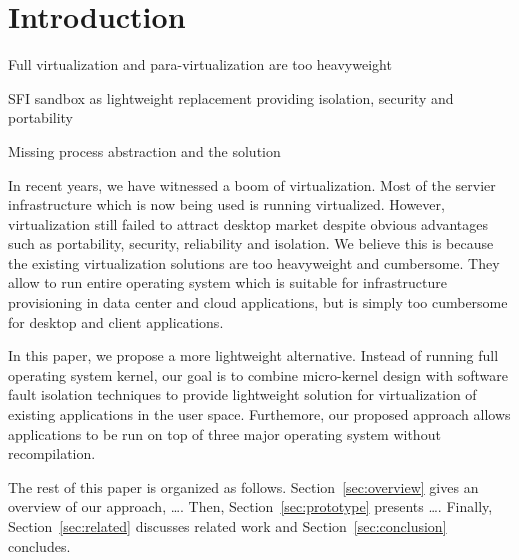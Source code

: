 \section{Introduction}
\label{sec:intro}

\begin{structure}
  \item Full virtualization and para-virtualization are too heavyweight
  \item SFI sandbox as lightweight replacement providing isolation,
    security and portability
  \item Missing process abstraction and the solution
\end{structure}

In recent years, we have witnessed a boom of virtualization. Most of the
servier infrastructure which is now being used is running virtualized.
However, virtualization still failed to attract desktop market despite
obvious advantages such as portability, security, reliability and
isolation. We believe this is because the existing virtualization
solutions are too heavyweight and cumbersome. They allow to run entire
operating system which is suitable for infrastructure provisioning in
data center and cloud applications, but is simply too cumbersome for
desktop and client applications.

In this paper, we propose a more lightweight alternative. Instead of
running full operating system kernel, our goal is to combine
micro-kernel design with software fault isolation techniques to provide
lightweight solution for virtualization of existing applications in the
user space.  Furthemore, our proposed approach allows applications to be
run on top of three major operating system without recompilation.

The rest of this paper is organized as follows.
Section~\ref{sec:overview} gives an overview of our approach, \ldots.
Then, Section~\ref{sec:prototype} presents \ldots. Finally,
Section~\ref{sec:related} discusses related work and
Section~\ref{sec:conclusion} concludes.
